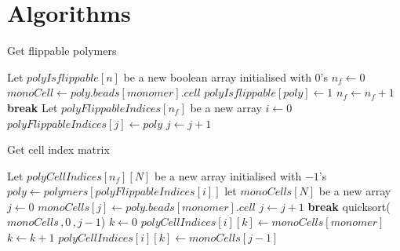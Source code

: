\documentclass[bachelor,       %
               twoside,        %
               BCOR10mm,       %
               ngerman, english %
               ]{GAUBM}
\begin{document}
\chapter{Algorithms}


\begin{algorithm}
\caption{Get flippable polymers}\label{alg:get_flip_candidates}
\begin{algorithmic}
\State Let $polyIsflippable[n]$ be a new boolean array initialised with $0$'s
\State $n_f\gets 0$
        \State $monoCell\gets poly.beads[monomer].cell$
            \State $polyIsflippable[poly]\gets 1$
            \State $n_f\gets n_f+1$
            \State \textbf{break}
        \EndIf
    \EndFor
\EndFor
\State Let $polyFlippableIndices[n_f]$ be a new array
\State $i\gets 0$
        \State $polyFlippableIndices[j]\gets poly$
        \State $j\gets j+1$
    \EndIf
\EndFor
\end{algorithmic}
\end{algorithm}

\begin{algorithm}
\caption{Get cell index matrix}\label{alg:get_cell_indices}
\begin{algorithmic}
\State Let $polyCellIndices[n_f][N]$ be a new array initialised with $-1$'s
    \State $poly \gets polymers[polyFlippableIndices[i]]$
    \State let $monoCells[N]$ be a new array
    \State $j\gets 0$
            \State $monoCells[j]\gets poly.beads[monomer].cell$
            \State $j\gets j+1$
            \State \textbf{break}
        \EndIf
    \EndFor
    \State quicksort($monoCells\,,0\,,j-1$)
    \State $k\gets 0$
            \State $polyCellIndices[i][k]\gets monoCells[monomer]$
            \State $k\gets k+1$
        \EndIf
    \EndFor
    \State $polyCellIndices[i][k]\gets monoCells[j-1]$
\EndFor
\end{algorithmic}
\end{algorithm}
\end{document}
